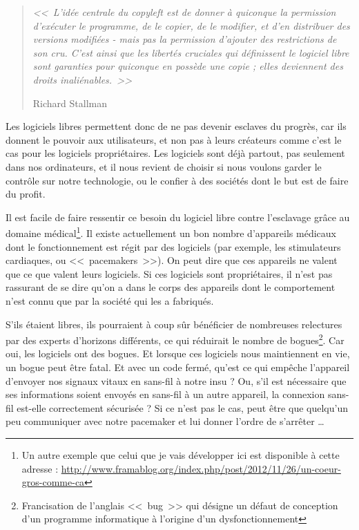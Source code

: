 \begin{quotation}
\textit{<<~L'idée centrale du copyleft est de donner à quiconque la permission d'exécuter le programme, de le copier, de le modifier, et d'en distribuer des versions modifiées - mais pas la permission d'ajouter des restrictions de son cru. C'est ainsi que les libertés cruciales qui définissent le logiciel libre sont garanties pour quiconque en possède une copie ; elles deviennent des droits inaliénables.~>>}
\begin{flushright}Richard Stallman\end{flushright}
\end{quotation}

Les logiciels libres permettent donc de ne pas devenir esclaves du progrès, car ils donnent le pouvoir aux utilisateurs, et non pas à leurs créateurs comme c'est le cas pour les logiciels propriétaires.
Les logiciels sont déjà partout, pas seulement dans nos ordinateurs, et il nous revient de choisir si nous voulons garder le contrôle sur notre technologie, ou le confier à des sociétés dont le but est de faire du profit.

Il est facile de faire ressentir ce besoin du logiciel libre contre l'esclavage grâce au domaine médical\footnote{Un autre exemple que celui que je vais développer ici est disponible à cette adresse : \url{http://www.framablog.org/index.php/post/2012/11/26/un-coeur-gros-comme-ca}}.
Il existe actuellement un bon nombre d'appareils médicaux dont le fonctionnement est régit par des logiciels (par exemple, les stimulateurs cardiaques, ou <<~pacemakers~>>).
On peut dire que ces appareils ne valent que ce que valent leurs logiciels.
Si ces logiciels sont propriétaires, il n'est pas rassurant de se dire qu'on a dans le corps des appareils dont le comportement n'est connu que par la société qui les a fabriqués.

S'ils étaient libres, ils pourraient à coup sûr bénéficier de nombreuses relectures par des experts d'horizons différents, ce qui réduirait le nombre de bogues\footnote{Francisation de l'anglais <<~bug~>> qui désigne un défaut de conception d'un programme informatique à l'origine d'un dysfonctionnement}.
Car oui, les logiciels ont des bogues.
Et lorsque ces logiciels nous maintiennent en vie, un bogue peut être fatal.
Et avec un code fermé, qu'est ce qui empêche l'appareil d'envoyer nos signaux vitaux en sans-fil à notre insu ?
Ou, s'il est nécessaire que ses informations soient envoyés en sans-fil à un autre appareil, la connexion sans-fil est-elle correctement sécurisée ?
Si ce n'est pas le cas, peut être que quelqu'un peu communiquer avec notre pacemaker et lui donner l'ordre de s'arrêter \dots{}

